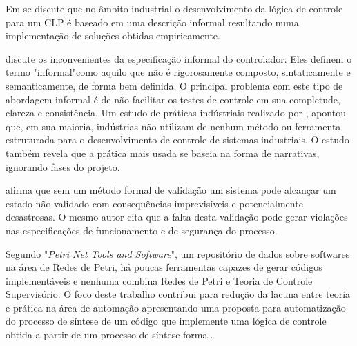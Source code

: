 
Em \cite{lealqueiroz2017} se discute que no \^ambito industrial o desenvolvimento da l\'ogica de controle para um CLP \'e baseado em uma descri\c{c}\~ao informal resultando numa implementa\c{c}\~ao de solu\c{c}\~oes obtidas empiricamente.

\cite{Litz2000} discute os inconvenientes da especifica\c{c}\~ao informal do controlador. Eles definem o termo "informal"\space como aquilo que n\~ao \'e rigorosamente composto, sintaticamente e semanticamente, de forma bem definida. %
O principal problema com este tipo de abordagem informal \'e de n\~ao facilitar os testes de controle em sua completude, clareza e consist\^encia. Um estudo de pr\'aticas ind\'ustriais realizado por \cite{colla2006}, apontou que, em sua maioria, ind\'ustrias n\~ao  utilizam de nenhum m\'etodo ou ferramenta estruturada para o desenvolvimento de controle de sistemas industriais. O estudo tamb\'em revela que a pr\'atica mais usada se baseia na forma de narrativas, ignorando fases do projeto.

\cite{hugomestrado} afirma que sem um m\'etodo formal de valida\c{c}\~ao um sistema pode alcan\c{c}ar um estado n\~ao validado com consequ\^encias imprevis\'iveis e potencialmente desastrosas. O mesmo autor cita que a falta desta valida\c{c}\~ao pode gerar viola\c{c}\~oes nas especifica\c{c}\~oes de funcionamento e de seguran\c{c}a do processo.



Segundo "\textit{Petri Net Tools and Software}", um reposit\'orio de dados sobre softwares na \'area de Redes de Petri, h\'a poucas ferramentas capazes de gerar c\'odigos implement\'aveis e nenhuma combina Redes de Petri e Teoria de Controle Supervis\'orio. O foco deste trabalho contribui para redu\c{c}\~ao da lacuna entre teoria e pr\'atica na \'area de automa\c{c}\~ao apresentando uma proposta para automatiza\c{c}\~ao do processo de s\'intese de um c\'odigo que implemente uma l\'ogica de controle obtida a partir de um processo de s\'intese formal.

